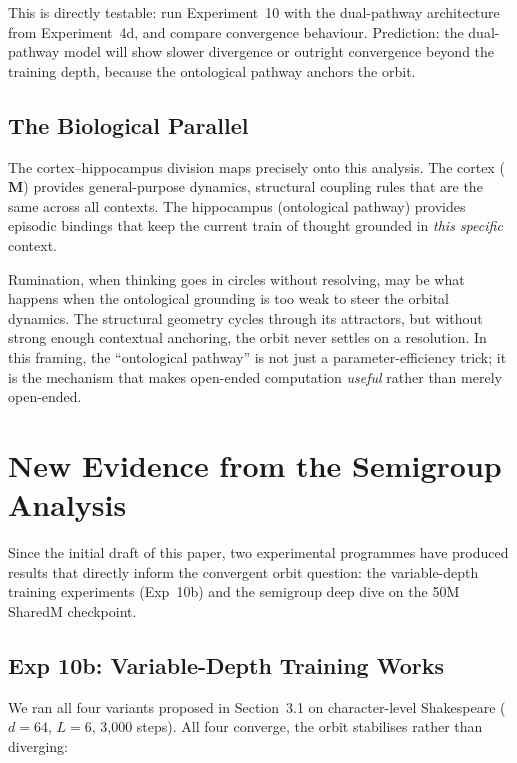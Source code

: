 \documentclass[11pt, a4paper]{article}
\newcommand{\M}{\mathbf{M}}
\theoremstyle{plain}
\theoremstyle{definition}
\theoremstyle{remark}
\begin{document}
This is directly testable: run Experiment~10 with the dual-pathway architecture from Experiment~4d, and compare convergence behaviour.
Prediction: the dual-pathway model will show slower divergence or outright convergence beyond the training depth, because the ontological pathway anchors the orbit.

\subsection{The Biological Parallel}

The cortex--hippocampus division maps precisely onto this analysis.
The cortex ($\M$) provides general-purpose dynamics, structural coupling rules that are the same across all contexts.
The hippocampus (ontological pathway) provides episodic bindings that keep the current train of thought grounded in \emph{this specific} context.

Rumination, when thinking goes in circles without resolving, may be what happens when the ontological grounding is too weak to steer the orbital dynamics.
The structural geometry cycles through its attractors, but without strong enough contextual anchoring, the orbit never settles on a resolution.
In this framing, the ``ontological pathway'' is not just a parameter-efficiency trick; it is the mechanism that makes open-ended computation \emph{useful} rather than merely open-ended.

\section{New Evidence from the Semigroup Analysis}

Since the initial draft of this paper, two experimental programmes have produced results that directly inform the convergent orbit question: the variable-depth training experiments (Exp~10b) and the semigroup deep dive on the 50M SharedM checkpoint.

\subsection{Exp 10b: Variable-Depth Training Works}

We ran all four variants proposed in Section~3.1 on character-level Shakespeare ($d{=}64$, $L{=}6$, 3{,}000 steps).
All four converge, the orbit stabilises rather than diverging:
\end{document}
